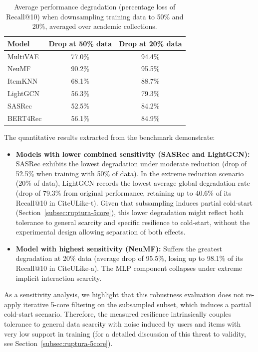\documentclass[journal]{IEEEtran}
\makeatletter
\newcommand{\at}[1]{@#1}
\makeatother
\begin{document}
\begin{table}[h]
\centering
\caption{Average performance degradation (percentage loss of Recall\at{10}) when downsampling training data to 50\% and 20\%, averaged over academic collections.}
\label{tab:robustness}
\footnotesize
\begin{tabular}{lcc}
\toprule
\textbf{Model} & \textbf{Drop at 50\% data} & \textbf{Drop at 20\% data} \\
\midrule
MultiVAE & 77.0\% & 94.4\% \\
NeuMF    & 90.2\% & 95.5\% \\
ItemKNN  & 68.1\% & 88.7\% \\
LightGCN & 56.3\% & 79.3\% \\
SASRec   & 52.5\% & 84.2\% \\
BERT4Rec & 56.1\% & 84.9\% \\
\bottomrule
\end{tabular}
\end{table}

The quantitative results extracted from the benchmark demonstrate:
\begin{itemize}
    \item \textbf{Models with lower combined sensitivity (SASRec and LightGCN):} SASRec exhibits the lowest degradation under moderate reduction (drop of 52.5\% when training with 50\% of data). In the extreme reduction scenario (20\% of data), LightGCN records the lowest average global degradation rate (drop of 79.3\% from original performance, retaining up to 40.6\% of its Recall\at{10} in CiteULike-t). Given that subsampling induces partial cold-start (Section~\ref{subsec:ruptura-5core}), this lower degradation might reflect both tolerance to general scarcity and specific resilience to cold-start, without the experimental design allowing separation of both effects.
    \item \textbf{Model with highest sensitivity (NeuMF):} Suffers the greatest degradation at 20\% data (average drop of 95.5\%, losing up to 98.1\% of its Recall\at{10} in CiteULike-a). The MLP component collapses under extreme implicit interaction scarcity.
\end{itemize}
As a sensitivity analysis, we highlight that this robustness evaluation does not re-apply iterative 5-core filtering on the subsampled subset, which induces a partial cold-start scenario. Therefore, the measured resilience intrinsically couples tolerance to general data scarcity with noise induced by users and items with very low support in training (for a detailed discussion of this threat to validity, see Section~\ref{subsec:ruptura-5core}).
\end{document}
